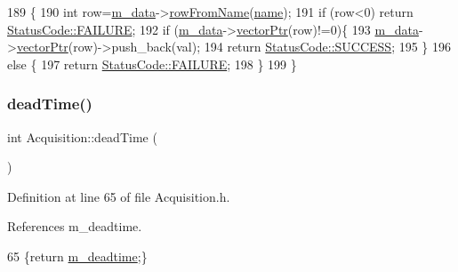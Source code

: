 \begin{DoxyCode}
189                                                  \{
190     \textcolor{keywordtype}{int} row=\hyperlink{classProcessus_a3da9a9de8af54e2f47807a3e09dfccff}{m\_data}->\hyperlink{classData_a72f9afe0edb22ad39871292f9f4d3d38}{rowFromName}(\hyperlink{classObject_a300f4c05dd468c7bb8b3c968868443c1}{name});
191     \textcolor{keywordflow}{if} (row<0) \textcolor{keywordflow}{return} \hyperlink{classStatusCode_a6f565cbeadc76d14c72f047e5e85eb4ba3da73d4c469762eb9d3c960368252b26}{StatusCode::FAILURE};
192     \textcolor{keywordflow}{if} (\hyperlink{classProcessus_a3da9a9de8af54e2f47807a3e09dfccff}{m\_data}->\hyperlink{classData_aa2153cb57f6f1a67b54eafe5582e0b6b}{vectorPtr}(row)!=0)\{
193       \hyperlink{classProcessus_a3da9a9de8af54e2f47807a3e09dfccff}{m\_data}->\hyperlink{classData_aa2153cb57f6f1a67b54eafe5582e0b6b}{vectorPtr}(row)->push\_back(val);
194       \textcolor{keywordflow}{return} \hyperlink{classStatusCode_a6f565cbeadc76d14c72f047e5e85eb4badd0da38d3ba0d922efd1f4619bc37ad8}{StatusCode::SUCCESS};
195     \}
196     \textcolor{keywordflow}{else} \{
197       \textcolor{keywordflow}{return} \hyperlink{classStatusCode_a6f565cbeadc76d14c72f047e5e85eb4ba3da73d4c469762eb9d3c960368252b26}{StatusCode::FAILURE};
198     \}
199   \}
\end{DoxyCode}
\mbox{\label{classAcquisition_a8fb2cd60a34993ab0952d719a8517831}} 
\subsubsection{\texorpdfstring{dead\+Time()}{deadTime()}\hspace{0.1cm}{\footnotesize\ttfamily [1/2]}}
{\footnotesize\ttfamily int Acquisition\+::dead\+Time (\begin{DoxyParamCaption}{ }\end{DoxyParamCaption})\hspace{0.3cm}{\ttfamily [inline]}}



Definition at line 65 of file Acquisition.\+h.



References m\+\_\+deadtime.


\begin{DoxyCode}
65 \{\textcolor{keywordflow}{return} \hyperlink{classAcquisition_a5f7fe20506e7d860ed61935255adfe17}{m\_deadtime};\}
\end{DoxyCode}
\mbox{\label{classAcquisition_a8fb2cd60a34993ab0952d719a8517831}} 
